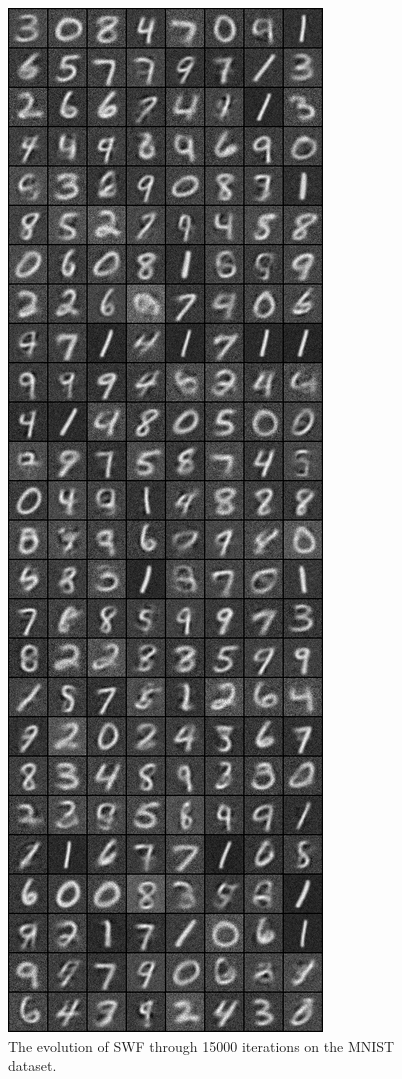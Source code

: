 \begin{figure}
\includegraphics[width=\picwidth\columnwidth]{figures/supplementary/mnist/image_25000.png}
\caption{The evolution of SWF through 15000 iterations on the MNIST dataset.}
\label{fig:suppmnist}
\end{figure}

